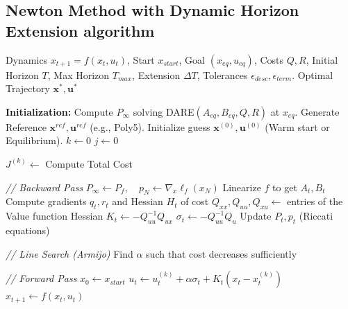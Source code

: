 \subsection{Newton Method with Dynamic Horizon Extension algorithm}
\begin{algorithm}[H]
\caption{Newton Method with Dynamic Horizon Extension}
\label{alg:newton_extension}
\begin{algorithmic}[1]
\Require 
    Dynamics $x_{t+1} = f(x_t, u_t)$, 
    Start $x_{start}$, Goal $(x_{eq}, u_{eq})$,
    Costs $Q, R$,
    Initial Horizon $T$, Max Horizon $T_{max}$, Extension $\Delta T$,
    Tolerances $\epsilon_{desc}, \epsilon_{term}$.
\Ensure Optimal Trajectory $\mathbf{x}^*, \mathbf{u}^*$

\State \textbf{Initialization:}
\State Compute $P_{\infty}$ solving DARE$(A_{eq}, B_{eq}, Q, R)$ at $x_{eq}$.
\State Generate Reference $\mathbf{x}^{ref}, \mathbf{u}^{ref}$ (e.g., Poly5).
\State Initialize guess $\mathbf{x}^{(0)}, \mathbf{u}^{(0)}$ (Warm start or Equilibrium).
\State $k \leftarrow 0$ 
\State $j \leftarrow 0$ 

 
    
    \Repeat {}
        \State $J^{(k)} \leftarrow$ Compute Total Cost
        
        \State \textit{// Backward Pass}
        \State $P_{\infty} \leftarrow P_f, \quad p_N \leftarrow \nabla_x \ell_f(x_N)$
            \State Linearize $f$ to get $A_t, B_t$
            \State Compute gradients $q_t, r_t$ and Hessian $H_t$ of cost
            \State $Q_{xx}, Q_{uu}, Q_{xu} \leftarrow$ entries of the Value function Hessian
            \State $K_t \leftarrow -Q_{uu}^{-1} Q_{ux}$ 
            \State $\sigma_t \leftarrow -Q_{uu}^{-1} Q_{u}$ 
            \State Update $P_t, p_t$ (Riccati equations)
        \EndFor
        
        \State \textit{// Line Search (Armijo)}
        \State Find $\alpha$ such that cost decreases sufficiently
        
        \State \textit{// Forward Pass}
        \State $x_0 \leftarrow x_{start}$
            \State $u_t \leftarrow u_t^{(k)} + \alpha \sigma_t + K_t(x_t - x_t^{(k)})$
            \State $x_{t+1} \leftarrow f(x_t, u_t)$
        \EndFor
        

\end{algorithmic}
\end{algorithm}
